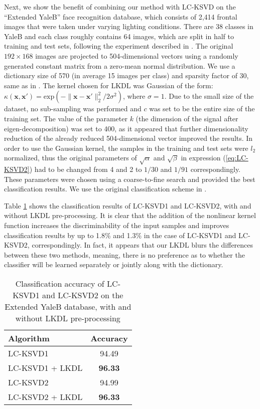 \documentclass[journal]{IEEEtran}
\newcommand{\bx}{\mathbf{x}}
\begin{document}
Next, we show the benefit of combining our method with LC-KSVD on the ``Extended YaleB'' face recognition database, which consists of 2,414 frontal images that were taken under varying lighting conditions. There are 38 classes in YaleB and each class roughly contains 64 images, which are split in half to training and test sets, following the experiment described in \cite{LCKSVD}. The original $192 \times 168$ images are projected to 504-dimensional vectors using a randomly generated constant matrix from a zero-mean normal distribution.
We use a dictionary size of 570 (in average 15 images per class) and sparsity factor of 30, same as in \cite{LCKSVD}. The kernel chosen for LKDL was Gaussian of the form: $\kappa(\bx,\bx')=\text{exp}\left(-\|\bx-\bx'\|_2^2/2{\sigma}^2\right)$, where $\sigma=1$. Due to the small size of the dataset, no sub-sampling was performed and $c$ was set to be the entire size of the training set. The value of the parameter $k$ (the dimension of the signal after eigen-decomposition) was set to 400, as it appeared that further dimensionality reduction of the already reduced 504-dimensional vector improved the results. In order to use the Gaussian kernel, the samples in the training and test sets were $l_2$ normalized, thus the original parameters of $\sqrt{\alpha}$ and $\sqrt{\beta}$ in expression (\ref{eq:LC-KSVD2}) had to be changed from 4 and 2 to $1/30$ and $1/91$ correspondingly. These parameters were chosen using a coarse-to-fine search and provided the best classification results. We use the original classification scheme in \cite{LCKSVD,LCKSVD2}.

Table \ref{table:LCKSVD YaleB_performance} shows the classification results of LC-KSVD1 and LC-KSVD2, with and without LKDL pre-processing. It is clear that the addition of the nonlinear kernel function increases the discriminability of the input samples and improves classification results by up to 1.8\% and 1.3\% in the case of LC-KSVD1 and LC-KSVD2, correspondingly. In fact, it appears that our LKDL blurs the differences between these two methods, meaning, there is no preference as to whether the classifier will be learned separately or jointly along with the dictionary.

\begin{table}[!t]
\caption{Classification accuracy of LC-KSVD1 and LC-KSVD2 on the Extended YaleB database, with and without LKDL pre-processing}
\label{table:LCKSVD YaleB_performance}
\centering
\begin{tabular}{||l||c||}
\multicolumn{1}{l}{\bf Algorithm}  &\multicolumn{1}{c}{\bf Accuracy} \\
\hline
LC-KSVD1 & 94.49 \\
\hline
LC-KSVD1 + LKDL & \textbf{96.33} \\
\hline
\hline
LC-KSVD2 & 94.99 \\
\hline
LC-KSVD2 + LKDL & \textbf{96.33} \\
\hline
\end{tabular}
\end{table}
\end{document}

